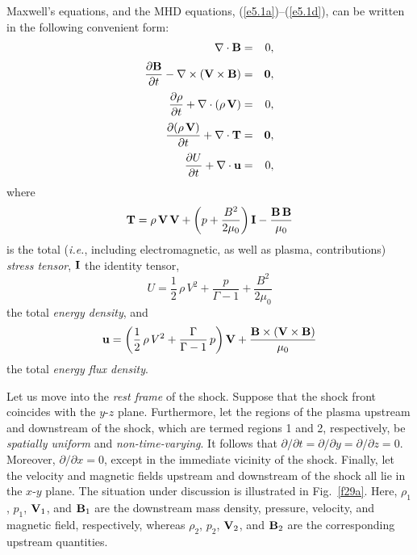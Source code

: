 Maxwell's equations, and the MHD equations, (\ref{e5.1a})--(\ref{e5.1d}),
can be written in the following convenient form:
\begin{eqnarray}\label{e5.239}
\nabla\cdot{\bf B} &=& 0,\\[0.5ex]
\frac{\partial {\bf B}}{\partial t} - \nabla\times ({\bf V}\times {\bf B}) &=& {\bf 0},\\[0.5ex]
\frac{\partial\rho}{\partial t} + \nabla\cdot(\rho\,{\bf V}) &=& 0,\\[0.5ex]
\frac{\partial (\rho\,{\bf V})}{\partial t} + \nabla\cdot{\bf T} &=&{\bf 0},\\[0.5ex]
\frac{\partial U}{\partial t} + \nabla\cdot {\bf u}&=&0,\label{e5.243}
\end{eqnarray}
where 
\begin{equation}
{\bf T} = \rho\,{\bf V}\,{\bf V} + \left(p+ \frac{B^2}{2\mu_0}\right){\bf I}- \frac{{\bf B}\,{\bf B}}{\mu_0}
\end{equation}
is the total ({\em i.e.}, including electromagnetic, as well as plasma,
contributions)
{\em stress tensor}, ${\bf I}$ the identity tensor,
\begin{equation}
U = \frac{1}{2}\,\rho\,V^2 + \frac{p}{\Gamma-1} + \frac{B^2}{2\mu_0}
\end{equation}
the total {\em energy density}, and 
\begin{equation}
{\bf u} = \left(\frac{1}{2}\,\rho\,V^2+ \frac{\Gamma}{\Gamma-1}\,p\right){\bf V}
+ \frac{{\bf B}\times ({\bf V}\times {\bf B})}{\mu_0}
\end{equation}
the total {\em energy flux density}.

Let us move into the {\em rest frame}\/ of the shock. Suppose that the
shock front coincides with the $y$-$z$ plane.
 Furthermore, let the regions
of the plasma upstream and downstream of the shock, which are termed
regions 1 and 2, respectively, be {\em spatially uniform}\/ and {\em non-time-varying}. It follows
that $\partial/\partial t = \partial/\partial y =\partial/\partial z=0$. Moreover,
$\partial/\partial x=0$, except in the immediate vicinity of the shock. 
Finally,  let the velocity
and magnetic fields  upstream and downstream of the shock
all lie in the $x$-$y$ plane. The situation under discussion is illustrated in Fig.~\ref{f29a}. Here, $\rho_1$, $p_1$, ${\bf V}_1$, and ${\bf B}_1$ are
the downstream mass density, pressure, velocity, and magnetic field,
respectively, whereas $\rho_2$, $p_2$, ${\bf V}_2$, and ${\bf B}_2$
are the corresponding upstream quantities.

